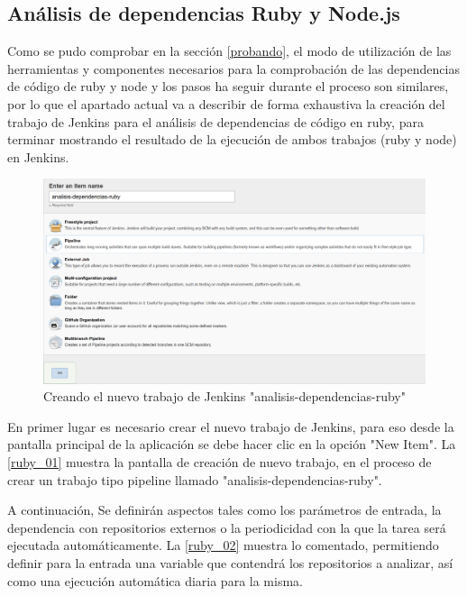 \subsection{Análisis de dependencias Ruby y Node.js}

Como se pudo comprobar en la sección \ref{probando}, el modo de utilización de las herramientas y componentes necesarios para la comprobación de las dependencias de código de ruby y node y los pasos ha seguir durante el proceso son similares, por lo que el apartado actual va a describir de forma exhaustiva la creación del trabajo de Jenkins para el análisis de dependencias de código en ruby, para terminar mostrando el resultado de la ejecución de ambos trabajos (ruby y node) en Jenkins.

\begin{figure}[htbp]
	\centering
	\includegraphics[width=1.0\linewidth]
	{desarrollo/figuras/ruby_01.png}
	\caption{Creando el nuevo trabajo de Jenkins "analisis-dependencias-ruby"}
	\label{ruby_01}
\end{figure}

En primer lugar es necesario crear el nuevo trabajo de Jenkins, para eso desde la pantalla principal de la aplicación se debe hacer clic en la opción "New Item". La \autoref{ruby_01} muestra la pantalla de creación de nuevo trabajo, en el proceso de crear un trabajo tipo pipeline llamado "analisis-dependencias-ruby".

A continuación, Se definirán aspectos tales como los parámetros de entrada, la dependencia con repositorios externos o la periodicidad con la que la tarea será ejecutada automáticamente. La \autoref{ruby_02} muestra lo comentado, permitiendo definir para la entrada una variable que contendrá los repositorios a analizar, así como una ejecución automática diaria para la misma.

